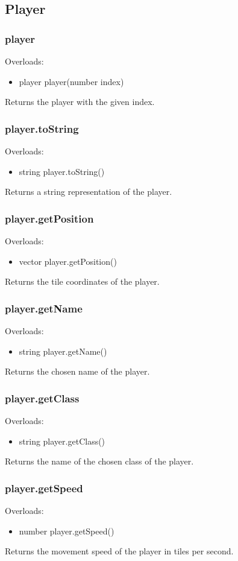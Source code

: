 \documentclass{book}
\newenvironment{ulist}
	{\begin{itemize}
			\itemsep0em}
	{\end{itemize}}
\begin{document}
\subsection{Player}
\subsubsection{player}
Overloads:
\begin{ulist}
	\item player player(number index)
\end{ulist}
Returns the player with the given index.

\subsubsection{player.toString}
Overloads:
\begin{ulist}
	\item string player.toString()
\end{ulist}
Returns a string representation of the player.

\subsubsection{player.getPosition}
Overloads:
\begin{ulist}
	\item vector player.getPosition()
\end{ulist}
Returns the tile coordinates of the player.

\subsubsection{player.getName}
Overloads:
\begin{ulist}
	\item string player.getName()
\end{ulist}
Returns the chosen name of the player.

\subsubsection{player.getClass}
Overloads:
\begin{ulist}
	\item string player.getClass()
\end{ulist}
Returns the name of the chosen class of the player.

\subsubsection{player.getSpeed}
Overloads:
\begin{ulist}
	\item number player.getSpeed()
\end{ulist}
Returns the movement speed of the player in tiles per second.
\end{document}
